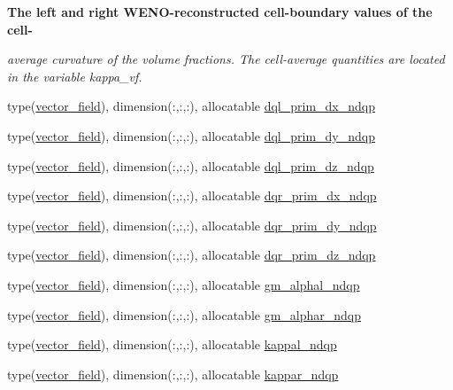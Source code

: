 \begin{Indent}\textbf{ The left and right W\+E\+N\+O-\/reconstructed cell-\/boundary values of the cell-\/}\par
{\em average curvature of the volume fractions. The cell-\/average quantities are located in the variable kappa\+\_\+vf. }\begin{DoxyCompactItemize}
\item 
type(\hyperlink{structm__derived__types_1_1vector__field}{vector\+\_\+field}), dimension(\+:,\+:,\+:), allocatable \hyperlink{namespacem__rhs_af321ac08aa0b1f2b444dc81d922445be}{dql\+\_\+prim\+\_\+dx\+\_\+ndqp}
\item 
type(\hyperlink{structm__derived__types_1_1vector__field}{vector\+\_\+field}), dimension(\+:,\+:,\+:), allocatable \hyperlink{namespacem__rhs_abd2dcf26ba04cbfac917774656aef38b}{dql\+\_\+prim\+\_\+dy\+\_\+ndqp}
\item 
type(\hyperlink{structm__derived__types_1_1vector__field}{vector\+\_\+field}), dimension(\+:,\+:,\+:), allocatable \hyperlink{namespacem__rhs_a4fdfac6ef18dff54b9f466f8cfb12c50}{dql\+\_\+prim\+\_\+dz\+\_\+ndqp}
\item 
type(\hyperlink{structm__derived__types_1_1vector__field}{vector\+\_\+field}), dimension(\+:,\+:,\+:), allocatable \hyperlink{namespacem__rhs_a190b9d019243f3504246e0e621e4bc66}{dqr\+\_\+prim\+\_\+dx\+\_\+ndqp}
\item 
type(\hyperlink{structm__derived__types_1_1vector__field}{vector\+\_\+field}), dimension(\+:,\+:,\+:), allocatable \hyperlink{namespacem__rhs_a40f05825c656c34602ba19e320537359}{dqr\+\_\+prim\+\_\+dy\+\_\+ndqp}
\item 
type(\hyperlink{structm__derived__types_1_1vector__field}{vector\+\_\+field}), dimension(\+:,\+:,\+:), allocatable \hyperlink{namespacem__rhs_a9cf1c914824cb4cc3476416da9be78f4}{dqr\+\_\+prim\+\_\+dz\+\_\+ndqp}
\item 
type(\hyperlink{structm__derived__types_1_1vector__field}{vector\+\_\+field}), dimension(\+:,\+:,\+:), allocatable \hyperlink{namespacem__rhs_a5886ad6e79bba7c4cf7fa1475aac824a}{gm\+\_\+alphal\+\_\+ndqp}
\item 
type(\hyperlink{structm__derived__types_1_1vector__field}{vector\+\_\+field}), dimension(\+:,\+:,\+:), allocatable \hyperlink{namespacem__rhs_a871a36bf12852bfc85560beba25cbfb9}{gm\+\_\+alphar\+\_\+ndqp}
\item 
type(\hyperlink{structm__derived__types_1_1vector__field}{vector\+\_\+field}), dimension(\+:,\+:,\+:), allocatable \hyperlink{namespacem__rhs_a52c1749bb933147f34129949411d72cd}{kappal\+\_\+ndqp}
\item 
type(\hyperlink{structm__derived__types_1_1vector__field}{vector\+\_\+field}), dimension(\+:,\+:,\+:), allocatable \hyperlink{namespacem__rhs_a5114054db70e67aaf7b2c8e71d63c934}{kappar\+\_\+ndqp}
\end{DoxyCompactItemize}
\end{Indent}
